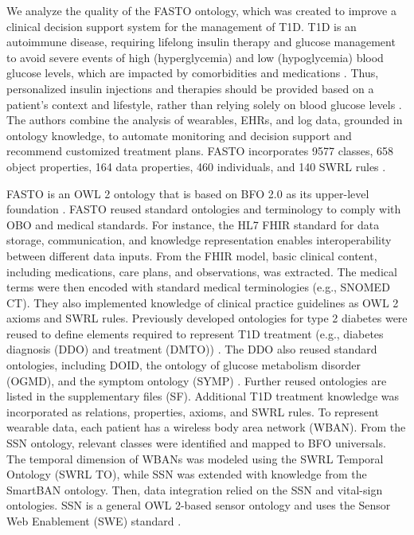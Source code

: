 \documentclass[
]{ceurart}
\begin{document}
We analyze the quality of the FASTO ontology, which was created to improve a clinical decision support system for the management of T1D. T1D is an autoimmune disease, requiring lifelong insulin therapy and glucose management to avoid severe events of high (hyperglycemia) and low (hypoglycemia) blood glucose levels, which are impacted by comorbidities and medications \cite{elsayed_2_2023, ElSappagh2019_FASTO}. Thus, personalized insulin injections and therapies should be provided based on a patient's context and lifestyle, rather than relying solely on blood glucose levels \cite{Cinar2026Twins}. The authors combine the analysis of wearables, EHRs, and log data, grounded in ontology knowledge, to automate monitoring and decision support and recommend customized treatment plans. FASTO incorporates 9577 classes, 658 object properties, 164 data properties, 460 individuals, and 140 SWRL rules \cite{ElSappagh2019_FASTO}. 

FASTO is an OWL 2 ontology that is based on BFO 2.0 as its upper-level foundation \cite{ElSappagh2019_FASTO}. FASTO reused standard ontologies and terminology to comply with OBO and medical standards. For instance, the HL7 FHIR standard for data storage, communication, and knowledge representation enables interoperability between different data inputs. From the FHIR model, basic clinical content, including medications, care plans, and observations, was extracted. The medical terms were then encoded with standard medical terminologies (e.g., SNOMED CT). They also implemented knowledge of clinical practice guidelines as OWL 2 axioms and SWRL rules. Previously developed ontologies for type 2 diabetes were reused to define elements required to represent T1D treatment (e.g., diabetes diagnosis (DDO) and treatment (DMTO)) \cite{ElSappagh2019_FASTO}. The DDO also reused standard ontologies, including DOID, the ontology of glucose metabolism disorder (OGMD), and the symptom ontology (SYMP) \cite{ElSappagh2016_DDO}. Further reused ontologies are listed in the supplementary files (SF). Additional T1D treatment knowledge was incorporated as relations, properties, axioms, and SWRL rules. To represent wearable data, each patient has a wireless body area network (WBAN). From the SSN ontology, relevant classes were identified and mapped to BFO universals. The temporal dimension of WBANs was modeled using the SWRL Temporal Ontology (SWRL TO), while SSN was extended with knowledge from the SmartBAN ontology. Then, data integration relied on the SSN and vital-sign ontologies. SSN is a general OWL 2-based sensor ontology and uses the Sensor Web Enablement (SWE) standard \cite{ElSappagh2019_FASTO}. 
\end{document}
